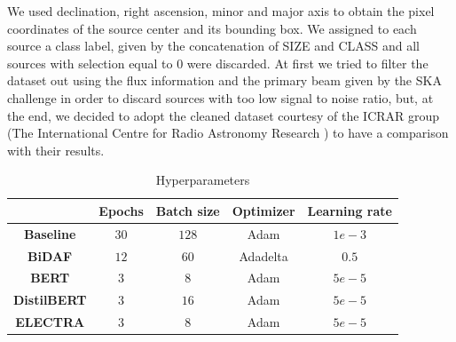 \documentclass[a4paper,10pt]{report}
\begin{document}
We used declination, right ascension, minor and major axis to obtain the pixel coordinates of the source center and its bounding box. We assigned to each source a class label, given by the concatenation of SIZE and CLASS and all sources with selection equal to 0 were discarded. At first we tried to filter the dataset out using the flux information and the primary beam given by the SKA challenge in order to discard sources with too low signal to noise ratio, but, at the end, we decided to adopt the cleaned dataset courtesy of the ICRAR group (The International Centre for Radio Astronomy Research ) to have a comparison with their results. 

\begin{table}[h]
  \center
  \begin{tabular}{|c|c|c|c|c|}
    \hline
                        & \textbf{Epochs} & \textbf{Batch size} & \textbf{Optimizer} & \textbf{Learning rate} \\ \hline
    \textbf{Baseline}   & $30$            & $128$               & Adam               & $1e-3$                 \\ \hline
    \textbf{BiDAF}      & $12$            & $60$                & Adadelta           & $0.5$                  \\ \hline
    \textbf{BERT}       & $3$             & $8$                 & Adam               & $5e-5$                 \\ \hline
    \textbf{DistilBERT} & $3$             & $16$                & Adam               & $5e-5$                 \\ \hline
    \textbf{ELECTRA}    & $3$             & $8$                 & Adam               & $5e-5$                 \\ \hline
  \end{tabular}
  \caption{Hyperparameters}
  \label{table:hyperparameters}
\end{table}
\end{document}

